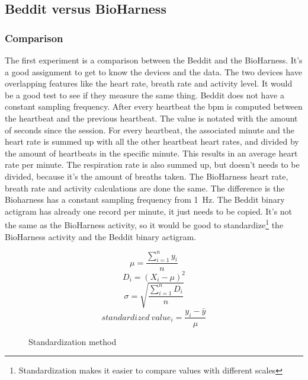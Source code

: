 	\subsection{Beddit versus BioHarness}
		\label{sec:bvsb}
		\subsubsection{Comparison}
			The first experiment is a comparison between the Beddit and the BioHarness. It's a good assignment to get to know the devices and the data. The two devices have overlapping features like the heart rate, breath rate and activity level. It would be a good test to see if they measure the same thing. 
			Beddit does not have a constant sampling frequency. After every heartbeat the bpm is computed between the heartbeat and the previous heartbeat. The value is notated with the amount of seconds since the session. For every heartbeat, the associated minute and the heart rate is summed up with all the other heartbeat heart rates, and divided by the amount of heartbeats in the specific minute. This results in an average heart rate per minute. The respiration rate is also summed up, but doesn't needs to be divided, because it's the amount of breaths taken.
			The BioHarness heart rate, breath rate and activity calculations are done the same. The difference is the Bioharness has a constant sampling frequency from \SI{1}{\hertz}. 
			The Beddit binary actigram has already one record per minute, it just needs to be copied. It's not the same as the BioHarness activity, so it would be good to standardize\footnote{Standardization makes it easier to compare values with different scales} the BioHarness activity and the Beddit binary actigram.
			\begin{figure}[h]
				\begin{equation}
					\label{eq:standardize}
					\mu = \frac{ \sum\limits_{i=1}^n y_i } { n }
				\end{equation}
				\begin{equation}
					D_i = (X_i - \mu)^2
				\end{equation}
				\begin{equation}
					\sigma = \sqrt{ \frac{ \sum\limits_{i=1}^n D_i } { n } }
				\end{equation}
				\begin{equation}
					standardized\ value_i = \frac{ y_i - \bar{y} } { \mu }
				\end{equation}
				\caption{Standardization method\cite{statistics}}
			\end{figure}

